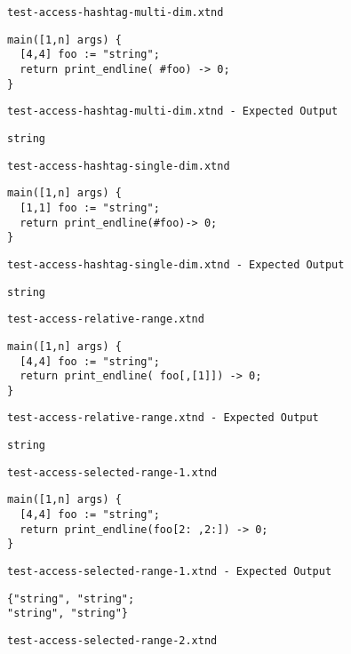 \medskip \noindent \texttt{test-access-hashtag-multi-dim.xtnd}


\begin{lstlisting}
main([1,n] args) {
  [4,4] foo := "string";
  return print_endline( #foo) -> 0;
}
\end{lstlisting}


\medskip \noindent \texttt{test-access-hashtag-multi-dim.xtnd - Expected Output}


\begin{lstlisting}
string
\end{lstlisting}


\medskip \noindent \texttt{test-access-hashtag-single-dim.xtnd}


\begin{lstlisting}
main([1,n] args) {
  [1,1] foo := "string";
  return print_endline(#foo)-> 0;
}
\end{lstlisting}


\medskip \noindent \texttt{test-access-hashtag-single-dim.xtnd - Expected Output}


\begin{lstlisting}
string
\end{lstlisting}


\medskip \noindent \texttt{test-access-relative-range.xtnd}


\begin{lstlisting}
main([1,n] args) {
  [4,4] foo := "string";
  return print_endline( foo[,[1]]) -> 0;
}
\end{lstlisting}


\medskip \noindent \texttt{test-access-relative-range.xtnd - Expected Output}


\begin{lstlisting}
string
\end{lstlisting}


\medskip \noindent \texttt{test-access-selected-range-1.xtnd}


\begin{lstlisting}
main([1,n] args) {
  [4,4] foo := "string";
  return print_endline(foo[2: ,2:]) -> 0;
}
\end{lstlisting}


\medskip \noindent \texttt{test-access-selected-range-1.xtnd - Expected Output}


\begin{lstlisting}
{"string", "string";
"string", "string"}
\end{lstlisting}


\medskip \noindent \texttt{test-access-selected-range-2.xtnd}


